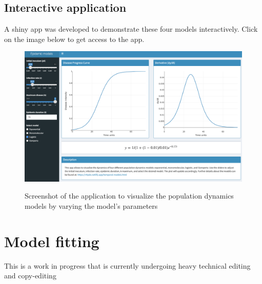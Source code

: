 \documentclass[
  letterpaper,
  DIV=11,
  numbers=noendperiod]{scrreprt}
\begin{document}
\hypertarget{interactive-application}{%
\section{Interactive application}\label{interactive-application}}

A shiny app was developed to demonstrate these four models
interactively. Click on the image below to get access to the app.

\begin{figure}

{\centering 

\href{https://edelponte.shinyapps.io/epidemics/}{\includegraphics[width=5.55208in,height=\textheight]{imgs/epidemic_models.png}}

}

\caption{\label{fig-models}Screenshot of the application to visualize
the population dynamics models by varying the model's parameters}

\end{figure}

\hypertarget{model-fitting}{%
\chapter{Model fitting}\label{model-fitting}}

\begin{tcolorbox}[enhanced jigsaw, breakable, left=2mm, opacityback=0, rightrule=.15mm, toprule=.15mm, colframe=quarto-callout-note-color-frame, arc=.35mm, colback=white, bottomrule=.15mm, leftrule=.75mm]
\begin{minipage}[t]{5.5mm}
\textcolor{quarto-callout-note-color}{\faInfo}
\end{minipage}%
\begin{minipage}[t]{\textwidth - 5.5mm}

This is a work in progress that is currently undergoing heavy technical
editing and copy-editing

\end{minipage}%
\end{tcolorbox}
\end{document}
